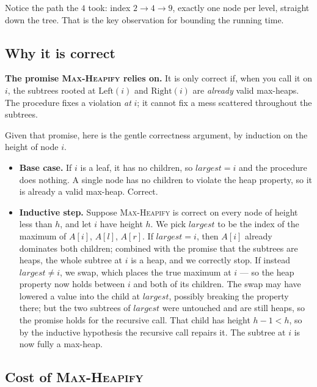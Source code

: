 Notice the path the $4$ took: index $2 \to 4 \to 9$, exactly one node per level,
straight down the tree. That is the key observation for bounding the running time.

\subsection{Why it is correct}

\begin{focusbox}
\textbf{The promise \textsc{Max-Heapify} relies on.} It is only correct if, when
you call it on $i$, the subtrees rooted at $\mathrm{Left}(i)$ and
$\mathrm{Right}(i)$ are \emph{already} valid max-heaps. The procedure fixes a
violation \emph{at} $i$; it cannot fix a mess scattered throughout the subtrees.
\end{focusbox}

Given that promise, here is the gentle correctness argument, by induction on the
height of node $i$.

\begin{itemize}
\item \textbf{Base case.} If $i$ is a leaf, it has no children, so
$\mathit{largest}=i$ and the procedure does nothing. A single node has no children
to violate the heap property, so it is already a valid max-heap. Correct.
\item \textbf{Inductive step.} Suppose \textsc{Max-Heapify} is correct on every
node of height less than $h$, and let $i$ have height $h$. We pick
$\mathit{largest}$ to be the index of the maximum of $A[i]$, $A[l]$, $A[r]$. If
$\mathit{largest}=i$, then $A[i]$ already dominates both children; combined with
the promise that the subtrees are heaps, the whole subtree at $i$ is a heap, and
we correctly stop. If instead $\mathit{largest}\ne i$, we swap, which places the
true maximum at $i$ --- so the heap property now holds between $i$ and both of
its children. The swap may have lowered a value into the child at
$\mathit{largest}$, possibly breaking the property there; but the two subtrees of
$\mathit{largest}$ were untouched and are still heaps, so the promise holds for
the recursive call. That child has height $h-1 < h$, so by the inductive
hypothesis the recursive call repairs it. The subtree at $i$ is now fully a
max-heap.
\end{itemize}

\subsection{Cost of \textsc{Max-Heapify}}


